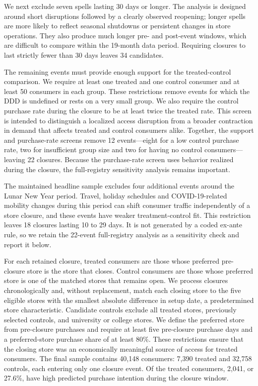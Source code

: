 \documentclass[11 pt]{article}
\begin{document}
We next exclude seven spells lasting 30 days or longer. The analysis is designed around short disruptions followed by a clearly observed reopening; longer spells are more likely to reflect seasonal shutdowns or persistent changes in store operations. They also produce much longer pre- and post-event windows, which are difficult to compare within the 19-month data period. Requiring closures to last strictly fewer than 30 days leaves 34 candidates.

The remaining events must provide enough support for the treated-control comparison. We require at least one treated and one control consumer and at least 50 consumers in each group. These restrictions remove events for which the DDD is undefined or rests on a very small group. We also require the control purchase rate during the closure to be at least twice the treated rate. This screen is intended to distinguish a localized access disruption from a broader contraction in demand that affects treated and control consumers alike. Together, the support and purchase-rate screens remove 12 events---eight for a low control purchase rate, two for insufficient group size and two for having no control consumers---leaving 22 closures. Because the purchase-rate screen uses behavior realized during the closure, the full-registry sensitivity analysis remains important.

The maintained headline sample excludes four additional events around the Lunar New Year period. Travel, holiday schedules and COVID-19-related mobility changes during this period can shift consumer traffic independently of a store closure, and these events have weaker treatment-control fit. This restriction leaves 18 closures lasting 10 to 29 days. It is not generated by a coded ex-ante rule, so we retain the 22-event full-registry analysis as a sensitivity check and report it below.

For each retained closure, treated consumers are those whose preferred pre-closure store is the store that closes. Control consumers are those whose preferred store is one of the matched stores that remains open. We process closures chronologically and, without replacement, match each closing store to the five eligible stores with the smallest absolute difference in setup date, a predetermined store characteristic. Candidate controls exclude all treated stores, previously selected controls, and university or college stores. We define the preferred store from pre-closure purchases and require at least five pre-closure purchase days and a preferred-store purchase share of at least 80\%. These restrictions ensure that the closing store was an economically meaningful source of access for treated consumers. The final sample contains 40,148 consumers: 7,390 treated and 32,758 controls, each entering only one closure event. Of the treated consumers, 2,041, or 27.6\%, have high predicted purchase intention during the closure window.
\end{document}
